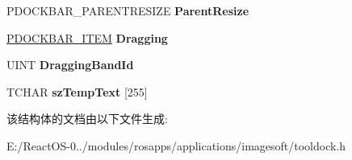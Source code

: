 \begin{DoxyCompactItemize}
P\+D\+O\+C\+K\+B\+A\+R\+\_\+\+P\+A\+R\+E\+N\+T\+R\+E\+S\+I\+ZE {\bfseries Parent\+Resize}
\item 
\mbox{\label{struct___t_o_o_l_b_a_r___d_o_c_k_s_aaf82d31fbc0298db8b27ecd3531e7820}} 
\hyperlink{struct___d_o_c_k_b_a_r___i_t_e_m}{P\+D\+O\+C\+K\+B\+A\+R\+\_\+\+I\+T\+EM} {\bfseries Dragging}
\item 
\mbox{\label{struct___t_o_o_l_b_a_r___d_o_c_k_s_ad9465e2f40cedb0970a55692374f33f1}} 
U\+I\+NT {\bfseries Dragging\+Band\+Id}
\item 
\mbox{\label{struct___t_o_o_l_b_a_r___d_o_c_k_s_ac88c90f2c97db5e8b99ce7c50086cbdb}} 
T\+C\+H\+AR {\bfseries sz\+Temp\+Text} \mbox{[}255\mbox{]}
\end{DoxyCompactItemize}


该结构体的文档由以下文件生成\+:\begin{DoxyCompactItemize}
\item 
E\+:/\+React\+O\+S-\/0../modules/rosapps/applications/imagesoft/tooldock.\+h\end{DoxyCompactItemize}
